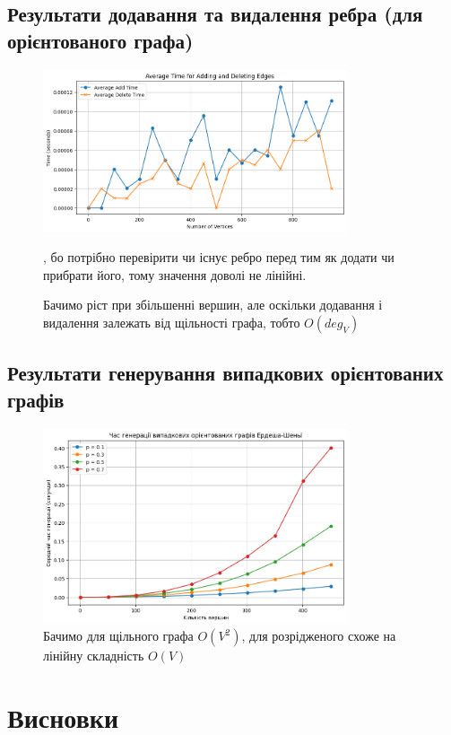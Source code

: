 \documentclass{article}
\begin{document}
\subsection{Результати додавання та видалення ребра (для орієнтованого графа)}
\begin{figure}[h!]
\centering
\includegraphics[width=0.8\textwidth]{img/edges2.png}
\caption{Бачимо ріст при збільшенні вершин, але оскільки додавання і видалення залежать від щільності графа, тобто $O(deg_V)$}, бо потрібно перевірити чи існує ребро перед тим як додати чи прибрати його, тому значення доволі не лінійні.
\label{fig:add, del edges}
\end{figure}

\newpage

\subsection{Результати генерування випадкових орієнтованих графів}
\begin{figure}[h!]
\centering
\includegraphics[width=0.8\textwidth]{img/randomgraphs.png}
\caption{Бачимо для щільного графа $O(V^2)$, для розрідженого схоже на лінійну складність $O(V)$}
\label{fig:random graphs}
\end{figure}
    
\section{Висновки}
\end{document}
